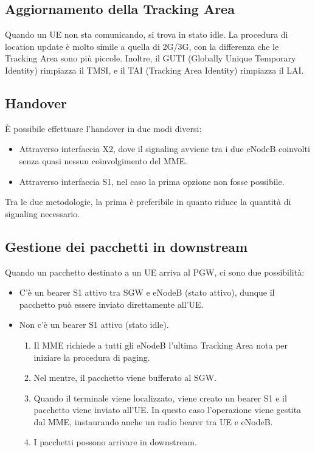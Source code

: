 \subsection{Aggiornamento della Tracking Area}
Quando un UE non sta comunicando, si trova in stato idle.
La procedura di location update è molto simile a quella di 2G/3G, con la differenza che le Tracking Area sono più piccole.
Inoltre, il GUTI (Globally Unique Temporary Identity) rimpiazza il TMSI, e il TAI (Tracking Area Identity) rimpiazza il LAI.
\subsection{Handover}
È possibile effettuare l'handover in due modi diversi:
\begin{itemize}
	\item Attraverso interfaccia X2, dove il signaling avviene tra i due eNodeB coinvolti senza quasi nessun coinvolgimento del MME.
	\item Attraverso interfaccia S1, nel caso la prima opzione non fosse possibile.
\end{itemize}
Tra le due metodologie, la prima è preferibile in quanto riduce la quantità di signaling necessario.
\subsection{Gestione dei pacchetti in downstream}
Quando un pacchetto destinato a un UE arriva al PGW, ci sono due possibilità:
\begin{itemize}
	\item C'è un bearer S1 attivo tra SGW e eNodeB (stato attivo), dunque il pacchetto può essere inviato direttamente all'UE.
	\item Non c'è un bearer S1 attivo (stato idle).
	\begin{enumerate}
		\item Il MME richiede a tutti gli eNodeB l'ultima Tracking Area nota per iniziare la procedura di paging.
		\item Nel mentre, il pacchetto viene bufferato al SGW.
		\item Quando il terminale viene localizzato, viene creato un bearer S1 e il pacchetto viene inviato all'UE.
		In questo caso l'operazione viene gestita dal MME, instaurando anche un radio bearer tra UE e eNodeB.
		\item I pacchetti possono arrivare in downstream.
	\end{enumerate}
\end{itemize}
